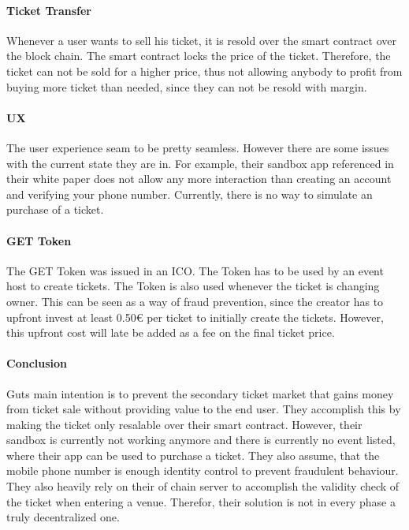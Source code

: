 \paragraph{Ticket Transfer}
Whenever a user wants to sell his ticket, it is resold over the smart contract over the block chain. The smart contract locks the price of the ticket. Therefore, the ticket can not be sold for a higher price, thus not allowing anybody to profit from buying more ticket than needed, since they can not be resold with margin. 


\paragraph{UX}
The user experience seam to be pretty seamless. However there are some issues with the current state they are in. For example, their sandbox app referenced in their white paper does not allow any more interaction than creating an account and verifying your phone number. Currently, there is no way to simulate an purchase of a ticket.  


\paragraph{GET Token}
The GET Token was issued in an ICO. The Token has to be used by an event host to create tickets. The Token is also used whenever the ticket is changing owner. This can be seen as a way of fraud prevention, since the creator has to upfront invest at least 0.50€ per ticket to initially create the tickets. However, this upfront cost will late be added as a fee on the final ticket price.


\paragraph{Conclusion}
Guts main intention is to prevent the secondary ticket market that gains money from ticket sale without providing value to the  end user. They accomplish this by making the ticket only resalable over their smart contract. However, their sandbox is currently not working anymore and there is currently no event listed, where their app can be used to purchase a ticket. They also assume, that the mobile phone number is enough identity control to prevent fraudulent behaviour. They also heavily rely on their of chain server to accomplish the validity check of the ticket when entering a venue. Therefor, their solution is not in every phase a truly decentralized one.  